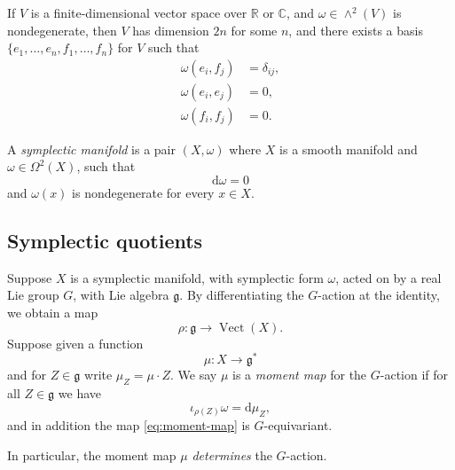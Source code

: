 \documentclass[12pt,letterpaper,reqno]{article}
\numberwithin{equation}{section}
\newcommand{\fg}{{\mathfrak g}}
\newcommand{\R}{\ensuremath{\mathbb R}}
\newcommand{\C}{\ensuremath{\mathbb C}}
\newcommand{\de}{\mathrm{d}}
\newcommand{\ti}[1]{\textit{#1}}
\DeclareMathOperator{\Vect}{Vect}
\begin{document}
\begin{prop} 
\label{prop:standard-nondegenerate-2-form}
If $V$ is a finite-dimensional vector space over $\R$ or $\C$, and
$\omega \in \wedge^2(V)$ is nondegenerate, then $V$ has 
dimension $2n$ for some $n$, and there
exists a basis $\{e_1, \dots, e_n, f_1, \dots, f_n\}$ for $V$
such that
\begin{align}
\omega(e_i, f_j) &= \delta_{ij}, \\
\omega(e_i, e_j) &= 0, \\
\omega(f_i, f_j) &= 0.
\end{align}
\end{prop}

\begin{defn}
A \ti{symplectic manifold} is a pair $(X,\omega)$
where $X$ is a smooth manifold and
$\omega \in \Omega^2(X)$, such that
\begin{equation}
  \de \omega = 0
\end{equation}
and $\omega(x)$ is nondegenerate for every $x \in X$.
\end{defn}


\subsection{Symplectic quotients}

\begin{defn}
Suppose $X$ is a symplectic manifold, with symplectic form $\omega$,
acted on by a real Lie group $G$, with Lie algebra
$\fg$. By differentiating the $G$-action at the identity,
we obtain a map
\begin{equation}
  \rho: \fg \to \Vect(X).
\end{equation}
Suppose given a function
\begin{equation} \label{eq:moment-map}
 \mu: X \to \fg^* 
\end{equation}
and for $Z \in \fg$ write $\mu_Z = \mu \cdot Z$.
We say $\mu$ is a \ti{moment map} for the $G$-action if 
for all $Z \in \fg$ we have
\begin{equation} \label{eq:moment-map-condition-3}
  \iota_{\rho(Z)} \omega = \de \mu_Z,
\end{equation}
and in addition the map \eqref{eq:moment-map} is $G$-equivariant.
\end{defn}
In particular, the moment map $\mu$ 
\ti{determines} the $G$-action.
\end{document}
